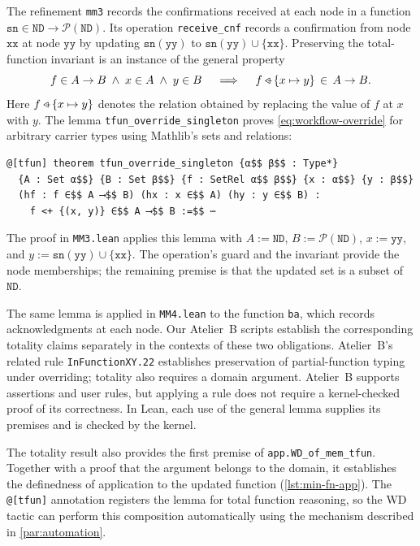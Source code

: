 \begin{example}
\label{ex:workflow-update}
The refinement \texttt{mm3} records the confirmations received at each node in a function $\mathtt{sn} \in \mathtt{ND} \to \mathcal{P}(\mathtt{ND})$.
Its operation \texttt{receive\_cnf} records a confirmation from node $\mathtt{xx}$ at node $\mathtt{yy}$ by updating $\mathtt{sn}(\mathtt{yy})$ to $\mathtt{sn}(\mathtt{yy}) \cup \{\mathtt{xx}\}$.
Preserving the total-function invariant is an instance of the general property
\begin{equation}
  {f \in A \to B} \;\land\; {x \in A} \;\land\; {y \in B}
  \quad\implies\quad
  f \bovr \{x \mapsto y\} \,\in\, A \to B.
  \label{eq:workflow-override}
\end{equation}
Here $f \bovr \{x \mapsto y\}$ denotes the relation obtained by replacing the value of $f$ at $x$ with $y$.
The lemma \texttt{tfun\_\allowbreak override\_\allowbreak singleton} proves \cref{eq:workflow-override} for arbitrary carrier types using Mathlib's sets and relations:
\begin{lstlisting}[language=lean, basicstyle=\small\ttfamily, numbers=none]
@[tfun] theorem tfun_override_singleton {α$$ β$$ : Type*}
  {A : Set α$$} {B : Set β$$} {f : SetRel α$$ β$$} {x : α$$} {y : β$$}
  (hf : f ∈$$ A ⟶$$ B) (hx : x ∈$$ A) (hy : y ∈$$ B) :
    f <+ {(x, y)} ∈$$ A ⟶$$ B :=$$ ⋯
\end{lstlisting}
The proof in \texttt{MM3.lean} applies this lemma with $A := \mathtt{ND}$, $B := \mathcal{P}(\mathtt{ND})$, $x := \mathtt{yy}$, and $y := \mathtt{sn}(\mathtt{yy}) \cup \{\mathtt{xx}\}$.
The operation's guard and the invariant provide the node memberships; the remaining premise is that the updated set is a subset of $\mathtt{ND}$.
\end{example}

The same lemma is applied in \texttt{MM4.lean} to the function \texttt{ba}, which records acknowledgments at each node.
Our Atelier~B scripts establish the corresponding totality claims separately in the contexts of these two obligations.
Atelier~B's related rule \texttt{InFunctionXY.22} establishes preservation of partial-function typing under overriding; totality also requires a domain argument.
Atelier~B supports assertions and user rules, but applying a rule does not require a kernel-checked proof of its correctness.
In Lean, each use of the general lemma supplies its premises and is checked by the kernel.

The totality result also provides the first premise of \texttt{app.WD\_of\_mem\_tfun}.
Together with a proof that the argument belongs to the domain, it establishes the definedness of application to the updated function (\cref{lst:min-fn-app}).
The \texttt{@[tfun]} annotation registers the lemma for total function reasoning, so the WD tactic can perform this composition automatically using the mechanism described in \cref{par:automation}.

